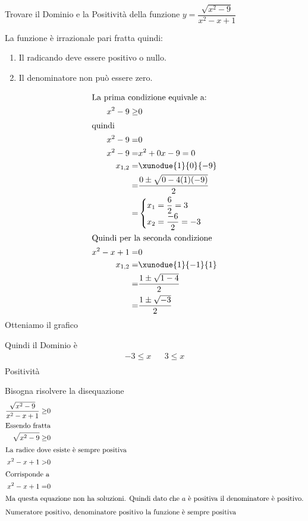 	Trovare il Dominio e la Positività  della funzione  $y=\dfrac{\sqrt{x^2-9}}{x^2-x+1}$
	
	La funzione è irrazionale pari fratta quindi:
	\begin{enumerate}
		\item Il radicando deve essere positivo o nullo.
		\item Il denominatore non può essere zero.
	\end{enumerate}
	\begin{align*}
		\intertext{La prima condizione equivale a:}
		x^2-9\geq &0\\
		\intertext{quindi}
		x^2-9=&0\\
		x^2-9=&x^2+0x-9=0\\
		x_{1,2}=&\xunodue{1}{0}{-9}\\
		=&\dfrac{0\pm\sqrt{0-4(1)(-9)}}{2}\\
		=&\begin{cases}
			x_1=\dfrac{6}{2}=3\\
			x_2=\dfrac{-6}{2}=-3
		\end{cases}\\
		\intertext{Quindi per la seconda condizione}
		x^2-x+1=&0\\
	x_{1,2}=&\xunodue{1}{-1}{1}\\
	=&\dfrac{1\pm\sqrt{1-4}}{2}\\
	=&\dfrac{1\pm\sqrt{-3}}{2}\\
	\end{align*}
	Otteniamo il grafico
	\begin{center}
		
	\end{center}
	Quindi il Dominio  è
	\begin{align*}
		-3\leq x&&3\leq x\\
	\end{align*}
 Positività

 Bisogna risolvere la disequazione
 \begin{align*}
 \dfrac{\sqrt{x^2-9}}{x^2-x+1}\geq&0\\
 \intertext{Essendo fratta}
 \sqrt{x^2-9}\geq&0\\
 \intertext{La radice dove esiste è sempre positiva}
  x^2-x+1>&0\\
  \intertext{Corrisponde a}
  x^2-x+1=&0\\
  \intertext{Ma questa equazione non ha soluzioni. Quindi dato che $a$ è positiva il denominatore è positivo.}
  \intertext{Numeratore positivo, denominatore positivo la funzione è sempre positiva}
 \end{align*}
